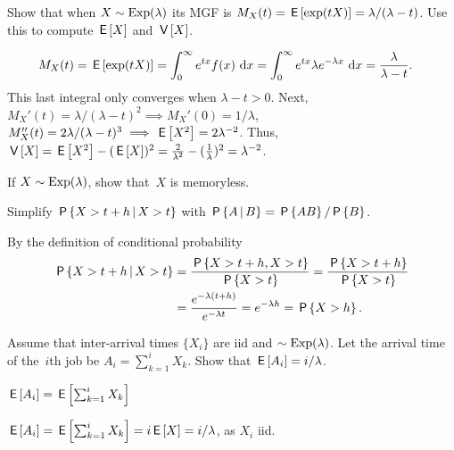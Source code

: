 \documentclass[stochastic-or.tex]{subfiles}
\begin{document}
\begin{exercise}\label{ex:11}
Show that when $X\sim \mathrm{Exp}(\lambda)$ its MGF is $ M_X(t) = \,\mathsf{E}\left[\exp(t X)\right] = \lambda/(\lambda -t)$. Use this to compute $\,\mathsf{E}\left[X\right]$ and $\,\mathsf{V}\left[X\right]$.
\begin{solution}
 \begin{align*}
 M_X(t) &= \,\mathsf{E}\left[\exp(t X)\right]
=\int_0^\infty e^{tx} f(x) \,\,\textrm{d}x
=\int_0^\infty e^{tx} \lambda e^{-\lambda x} \,\,\textrm{d}x =\frac{\lambda}{\lambda -t}.
 \end{align*}
This last integral only converges when $\lambda -t > 0$. Next, $M_X'(t)=\lambda/(\lambda-t)^2 \implies M_X'(0)=1/\lambda$, $M_X''(t)=2\lambda/(\lambda-t)^3 \implies \,\mathsf{E}\left[X^2\right]=2\lambda^{-2}$.
Thus, $\,\mathsf{V}\left[X\right] = \,\mathsf{E}\left[X^2\right] - (\,\mathsf{E}\left[X\right])^2 = \frac{2}{\lambda^2} - (\frac{1}{\lambda})^2 = \lambda^{-2}$.
\end{solution}
\end{exercise}


\begin{exercise}\label{ex:l-214}
If $X\sim \mathrm{Exp}(\lambda)$, show that~$X$ is memoryless.
\begin{hint}
Simplify $\,\mathsf{P}\left\{X>t+h\,\middle|\, X>t\right\}$ with $\,\mathsf{P}\left\{A\,\middle|\, B\right\} = \,\mathsf{P}\left\{AB\right\}/\,\mathsf{P}\left\{B\right\}$.
\end{hint}
\begin{solution}
By the definition of conditional probability
\begin{equation*}
  \begin{split}
 \,\mathsf{P}\left\{X>t+h\,\middle|\, X>t\right\} &= \frac{\,\mathsf{P}\left\{X>t+h, X>t\right\}}{\,\mathsf{P}\left\{X>t\right\}} = \frac{\,\mathsf{P}\left\{X>t+h\right\}}{\,\mathsf{P}\left\{X>t\right\}} \\
&= \frac{e^{-\lambda(t+h)}}{e^{-\lambda t}} = e^{-\lambda h} = \,\mathsf{P}\left\{X>h\right\}.
  \end{split}
\end{equation*}
\end{solution}
\end{exercise}


\begin{exercise}\label{ex:30}
 Assume  that inter-arrival times $\{X_i\}$ are iid and $\sim\mathrm{Exp}(\lambda)$. Let
the arrival time of the~$i$th job be $A_i=\sum_{k=1}^i X_k$. Show that
$\,\mathsf{E}\left[A_i\right] = i/\lambda$.
\begin{hint}
$\,\mathsf{E}\left[A_i\right] = \,\mathsf{E}\left[\sum_{k=1}^i X_k\right]$
\end{hint}
\begin{solution}
$\,\mathsf{E}\left[A_i\right] = \,\mathsf{E}\left[\sum_{k=1}^i X_k\right] = i \,\mathsf{E}\left[X\right] =  i/ \lambda$, as $X_i$ iid.
\end{solution}
\end{exercise}
\end{document}
